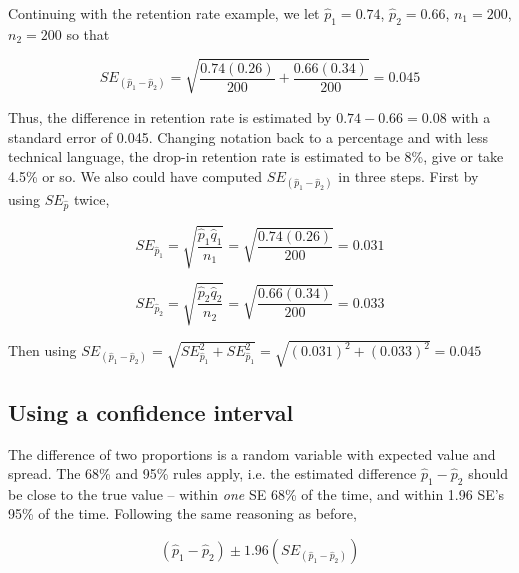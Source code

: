 \documentclass[11pt, chapterprefix=true]{scrbook}\usepackage[]{graphicx}\usepackage[]{color}
\begin{document}

Continuing with the retention rate example, we let $\hat{p}_1 = 0.74$, $\hat{p}_2 = 0.66$, $n_1 = 200$, $n_2 = 200$ so that

$$ SE_{( \hat{p}_1 - \hat{p}_2)} = \sqrt{ \frac{ 0.74 (0.26)}{200} + \frac{ 0.66 (0.34) }{200}} = 0.045 $$

Thus, the difference in retention rate is estimated by $0.74 - 0.66 = 0.08$ with a standard error of 0.045.  Changing notation back to a percentage and with less technical language, the drop-in retention rate is estimated to be 8\%, give or take 4.5\% or so. We also could have computed $ SE_{( \hat{p}_1 - \hat{p}_2)}$  in three steps.  First by using $SE_{\hat{p}}$ twice,

\begin{equation*}
  SE_{\hat{p}_1} = \sqrt{ \frac{\hat{p}_1 \hat{q}_1}{n_1}} = \sqrt{ \frac{0.74  (0.26)}{200}} = 0.031
\end{equation*}

\begin{equation*}
  SE_{\hat{p}_2} = \sqrt{ \frac{\hat{p}_2 \hat{q}_2}{n_2}} = \sqrt{ \frac{0.66  (0.34)}{200}} = 0.033
\end{equation*}

Then using $ SE_{( \hat{p}_1 - \hat{p}_2)} = \sqrt{ SE_{\hat{p}_1}^2 + SE_{\hat{p}_1}^2} = \sqrt{ (0.031)^2 + (0.033)^2} = 0.045 $

\subsection{Using a confidence interval}

The difference of two proportions is a random variable with expected value and spread.  The 68\% and 95\% rules apply, i.e.  the estimated difference $\hat{p}_1 - \hat{p}_2$ should be close to the true value -- within \textit{one} SE 68\% of the time, and within 1.96 SE's 95\% of the time.  Following the same reasoning as before,

\begin{equation*}
  (\hat{p}_1 - \hat{p}_2) \pm 1.96 (SE_{(\hat{p}_1 - \hat{p}_2)})
\end{equation*}
\end{document}
